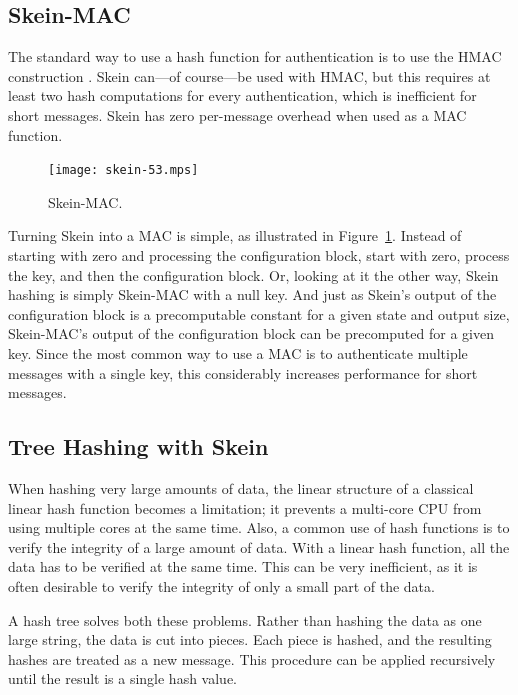 \documentclass[11pt,twoside]{article}
\begin{document}
\subsection{Skein-MAC}

The standard way to use a hash function for authentication is to use the HMAC construction \cite{HMAC1,HMAC2}.  Skein can---of course---be used with HMAC, but this requires at least two hash computations for every authentication, which is inefficient for short messages.  Skein has zero per-message overhead when used as a MAC function.
%
\begin{figure}[htbp]
\begin{center}
\texttt{[image: skein-53.mps]}
\end{center}
\caption{Skein-MAC.} \label{fig:SkeinMAC}
\end{figure}

Turning Skein into a MAC is simple, as illustrated in Figure~\ref{fig:SkeinMAC}.  Instead of starting with zero and processing the configuration block, start with zero, process the key, and then the configuration block.  Or, looking at it the other way, Skein hashing is simply Skein-MAC with a null key.  And just as Skein's output of the configuration block is a precomputable constant for a given state and output size, Skein-MAC's output of the configuration block can be precomputed for a given key.  Since the most common way to use a MAC is to authenticate multiple messages with a single key, this considerably increases performance for short messages.

\subsection{Tree Hashing with Skein}

When hashing very large amounts of data, the linear structure of a classical linear hash function becomes a limitation; it prevents a multi-core CPU from using multiple cores at the same time. Also, a common use of hash functions is to verify the integrity of a large amount of data.  With a linear hash function, all the data has to be verified at the same time.  This can be very inefficient, as it is often desirable to verify the integrity of only a small part of the data.

A hash tree \cite{Mer87,Mer89} solves both these problems.  Rather than hashing the data as one large string, the data is cut into pieces.  Each piece is hashed, and the resulting hashes are treated as a new message.  This procedure can be applied recursively until the result is a single hash value.
\end{document}
